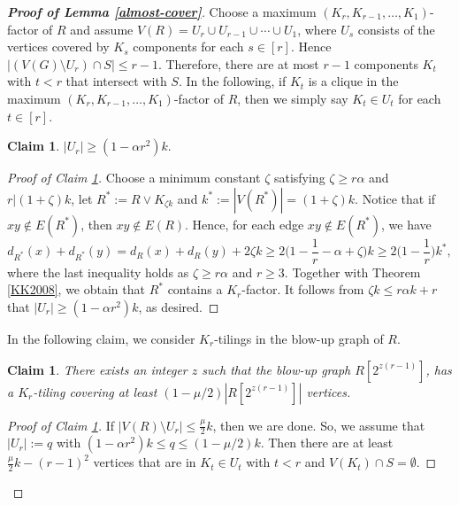 \documentclass[11pt, a4paper]{article}
\newtheorem{claim}[theorem]{Claim}
\theoremstyle{definition}
\newcommand{\eps}{\varepsilon}
\newcommand{\<}{\subseteq}
\begin{document}
\begin{proof}[\bf Proof of Lemma \ref{almost-cover}]
   
   Choose a maximum $(K_r,K_{r-1},\ldots,K_1)$-factor of $R$ and assume $V(R) = U_r \cup U_{r-1} \cup \cdots \cup U_1$, where $U_s$ consists of the vertices covered by $K_s$ components for each $s\in [r]$. Hence $|(V(G)\setminus U_r)\cap S|\leq r-1$. Therefore, there are at most $r-1$ components $K_t$ with $t<r$ that intersect with $S$. In the following, if $K_t$ is a clique in the maximum $(K_r,K_{r-1},\ldots,K_1)$-factor of $R$, then we simply say $K_t\in U_t$ for each $t\in [r]$.  %
\begin{claim}\label{a-almost}
    $|U_r|\geq (1-\alpha r^2)k.$
\end{claim}
\begin{proof}[Proof of Claim \ref{a-almost}]
    Choose a minimum constant $\zeta$ satisfying $\zeta\geq r\alpha$ and $r|(1+\zeta)k$, let $R^*:=R\vee K_{\zeta k}$ and $k^*:=|V(R^*)|=(1+\zeta)k$. Notice that if $xy\notin E(R^*)$, then $xy\notin E(R)$. Hence, for each edge $xy\notin E(R^*)$, we have  
    $$
    d_{R^*}(x)+d_{R^*}(y)=d_{R}(x)+d_{R}(y)+2\zeta k\geq 2\Big(1-\frac{1}{r}-\alpha+\zeta\Big)k\geq 2\Big(1-\frac{1}{r}\Big)k^*,
    $$
    where the last inequality holds as $\zeta \geq r\alpha$ and $r\ge 3$. 
    Together with Theorem \ref{KK2008}, we obtain that $R^*$ contains a $K_r$-factor. It follows from $\zeta k\leq r\alpha k+r$ that $|U_r|\geq (1-\alpha  r^2)k$, as desired. 
\end{proof}
In the following claim, we consider $K_r$-tilings in the blow-up graph of $R$. %
\begin{claim}\label{reduced-blow}
    There exists an integer $z$ such that the blow-up graph $R[2^{z(r-1)}]$, has a $K_r$-tiling covering at least $(1-\mu/2)|R[2^{z(r-1)}]|$ vertices.
\end{claim}
\begin{proof}[Proof of Claim \ref{reduced-blow}]
If $|V(R)\setminus U_r|\leq \frac{\mu}{2}k$, then  we are done. So, we assume that $|U_r|:=q$ with $(1-\alpha r^2)k\leq q\leq (1-\mu/2)k$. Then there are at least $\frac{\mu}{2}k-(r-1)^2$ vertices that are  in $K_t\in U_t$ with $t<r$ and $V(K_t)\cap S=\emptyset$. 


\end{proof}
\end{proof}
\end{document}
